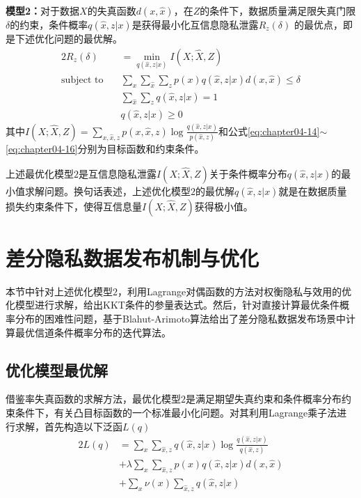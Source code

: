 \textbf{模型2：}对于数据$X$的失真函数$d(x,\hat{x})$，在$Z$的条件下，数据质量满足限失真门限$\delta$的约束，条件概率$q(\hat{x},z|x)$是获得最小化互信息隐私泄露$R_{z}(\delta)$ 的最优点，即是下述优化问题的最优解。
\begin{alignat}{2}%
	R_{z}(\delta) & =\min_{q(\hat{x},z|x)}I(X;\hat{X},Z) \nonumber \\
	\mbox{subject to} \quad
	& \sum_{x}\sum_{\hat{x}}\sum_{z}p(x)q(\hat{x},z|x)d(x,\hat{x})\leq  \delta \label{eq:chapter04-14}\\
	& \sum_{\hat{x}}\sum_{z}q(\hat{x},z|x)=1\\
	& q(\hat{x},z|x) \geq 0\label{eq:chapter04-16}
\end{alignat}
其中$I(X;\hat{X},Z)=\sum_{x,\hat{x},z}p(x,\hat{x},z)\log \frac{q(\hat{x},z|x)}{p(\hat{x},z)}$和公式\ref{eq:chapter04-14}$\sim$\ref{eq:chapter04-16}分别为目标函数和约束条件。

上述最优化模型$2$是互信息隐私泄露$I(X;\hat{X},Z)$关于条件概率分布$q(\hat{x},z|x)$的最小值求解问题。换句话表述，上述优化模型$2$的最优解$q(\hat{x},z|x)$就是在数据质量损失约束条件下，使得互信息量$I(X;\hat{X},Z)$获得极小值。

\section{差分隐私数据发布机制与优化}\label{chapter05-optimazation-mechanism}

本节中针对上述优化模型$2$，利用Lagrange对偶函数的方法对权衡隐私与效用的优化模型进行求解，给出KKT条件的参量表达式。然后，针对直接计算最优条件概率分布的困难性问题，基于Blahut-Arimoto算法给出了差分隐私数据发布场景中计算最优信道条件概率分布的迭代算法。

\subsection{优化模型最优解}

借鉴率失真函数的求解方法，最优化模型$2$是满足期望失真约束和条件概率分布约束条件下，有关凸目标函数的一个标准最小化问题。对其利用Lagrange乘子法进行求解，首先构造以下泛函$L(q)$
\begin{alignat}{2}
	L(q) & =\sum_{x}\sum_{\hat{x},z}q(\hat{x},z|x)\log \frac{q(\hat{x},z|x)}{q(\hat{x},z)} \nonumber \\
	  & + \lambda \sum_{x}\sum_{\hat{x},z}p(x)q(\hat{x},z|x)d(x,\hat{x}) \\
	& +\sum_{x}\nu (x)\sum_{\hat{x},z}q(\hat{x},z|x) \nonumber
\end{alignat}

